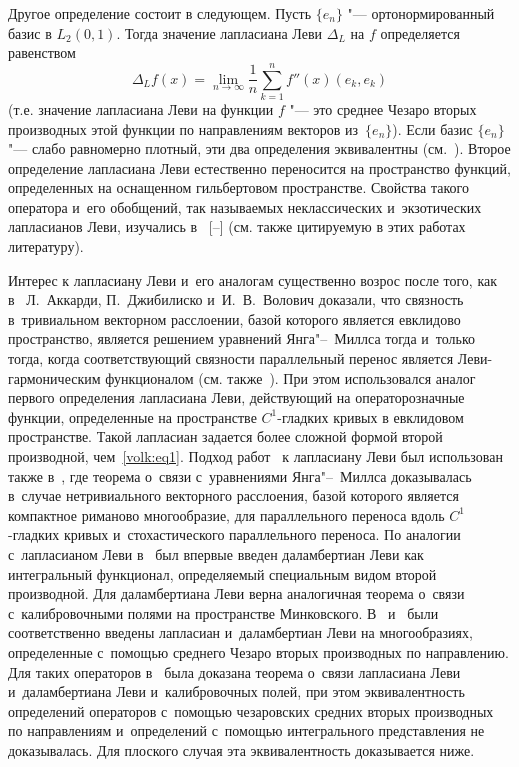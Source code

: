 Другое определение состоит в следующем.
 Пусть $\{e_n\}$ "---  ортонормированный базис в $L_2(0, 1)$. 
 Тогда значение лапласиана Леви $\Delta_L$ на $f$ определяется равенством
 $$
 \Delta_Lf(x)=\lim_{n\to\infty}\frac 1n \sum_{k=1}^n  f''(x)(e_k, e_k)
 $$
 (т.е. значение лапласиана Леви на  функции $f$ "--- это среднее Чезаро вторых производных этой функции по направлениям  векторов из~$\{e_n\}$).
Если базис  $\{e_n\}$ "--- слабо равномерно плотный, эти два определения эквивалентны \mbox{(см.~\cite{volkov:bib:L, volkov:bib:Fel}).}
Второе определение лапласиана Леви естественно переносится на пространство функций, определенных на оснащенном гильбертовом пространстве. Свойства такого оператора и~его  обобщений, так называемых неклассических и~экзотических лапласианов Леви, изучались 
в~%
[--]
(см. также цитируемую в этих работах литературу).



Интерес к лапласиану Леви и~его аналогам существенно возрос после того, как в~\cite{volkov:bib:AGV,volkov:bib:AGV2} Л.~Аккарди, П.~Джибилиско и~И.~В.~Волович доказали, что связность в~тривиальном векторном расслоении,  базой которого является евклидово пространство, является решением уравнений Янга"--~Миллса тогда и~только тогда, когда соответствующий связности параллельный перенос является  Леви-гармоническим функционалом (см. также~\cite{volkov:bib:ArV}). 
При этом использовался аналог первого определения лапласиана Леви, действующий на операторозначные функции, определенные на пространстве $C^1$-гладких кривых в евклидовом пространстве. 
Такой лапласиан задается более сложной формой второй производной, чем~\eqref{volk:eq1}. 
Подход работ~\cite{volkov:bib:AGV,volkov:bib:AGV2} к лапласиану Леви был использован также в~\cite{volkov:bib:LeVo}, где теорема о~связи с~уравнениями Янга"--~Миллса доказывалась  в~случае нетривиального векторного расслоения, базой  которого является компактное риманово многообразие, для параллельного переноса вдоль $C^1$-гладких кривых и~стохастического параллельного переноса.  
По аналогии с~лапласианом  Леви в~\cite{volkov:bib:AGV,volkov:bib:AGV2} был впервые введен даламбертиан Леви
как интегральный функционал, определяемый специальным видом второй производной. 
Для даламбертиана Леви верна аналогичная теорема
 о~связи с~калибровочными полями на  пространстве Минковского.
 В~\cite{volkov:bib:AS006} и~\cite{volkov:bib:v1} были  соответственно введены лапласиан и~даламбертиан Леви на многообразиях, определенные с~помощью среднего Чезаро вторых производных по направлению.
Для таких операторов в~\cite{volkov:bib:v1} была доказана теорема о~связи лапласиана Леви и~даламбертиана Леви и~калибровочных полей, при этом эквивалентность определений операторов с~помощью чезаровских средних вторых производных по направлениям и~определений с~помощью интегрального представления не доказывалась. 
Для плоского случая эта эквивалентность  доказывается ниже.

